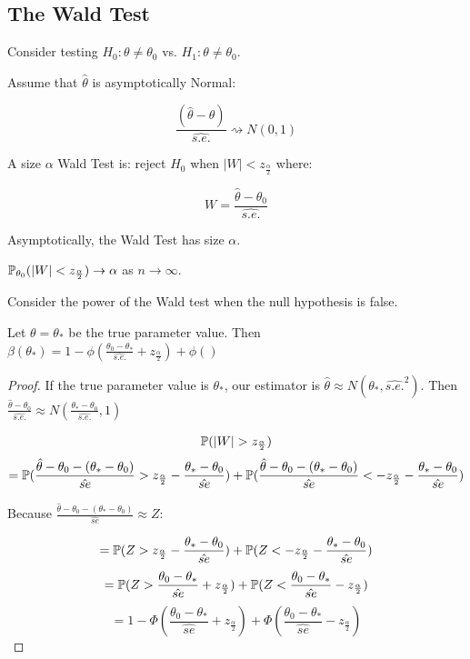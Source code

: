 \documentclass[10pt]{article}
\begin{document}
\subsection{The Wald Test}

\begin{definition}
    Consider testing $H_0: \theta \neq \theta_0$ vs. $H_1: \theta \neq \theta_0$.

    Assume that $\hat{\theta}$ is asymptotically Normal:

    \[ \frac{(\hat{\theta} - \theta)}{\hat{s.e.}} \rightsquigarrow N(0, 1)\]

    A size $\alpha$ Wald Test is: reject $H_0$ when $|W| <
    z_{\frac{\alpha}{2}}$ where:

    \[ W = \frac{\hat{\theta} - \theta_0}{\hat{s.e.}}\]
\end{definition}

\begin{theorem}
    Asymptotically, the Wald Test has size $\alpha$.

    $\P_{\theta_0}(|W| < z_{\frac{\alpha}{2}}) \rightarrow \alpha$ as $n \rightarrow \infty$.
\end{theorem}

Consider the power of the Wald test when the null hypothesis is false.

\begin{theorem}
    Let $\theta = \theta_*$ be the true parameter value. Then $\beta(\theta_*)
    = 1 - \phi(\frac{\theta_0 - \theta_*}{\hat{s.e.}} + z_{\frac{\alpha}{2}}) + \phi()$
\end{theorem}

\begin{proof}
    If the true parameter value is $\theta_*$, our estimator is $\hat{\theta}
    \approx N(\theta_*, \hat{s.e.}^2)$. Then $\frac{\hat{\theta} -
    \theta_0}{\hat{s.e.}} \approx N(\frac{\theta_* - \theta_0}{\hat{s.e.}}, 1)$

    \[\P(|W| > z_{\frac{\alpha}{2}})\] 
    \[= \P(\frac{\hat{\theta} - \theta_0 - (\theta_* - \theta_0)}{\hat{se}} >
    z_{\frac{\alpha}{2}} - \frac{\theta_* - \theta_0}{\hat{se}}) +
\P(\frac{\hat{\theta} - \theta_0 - (\theta_* - \theta_0)}{\hat{se}} < -z_{\frac{\alpha}{2}} - \frac{\theta_* - \theta_0}{\hat{se}})\]

Because $\frac{\hat{\theta} - \theta_0 - (\theta_* - \theta_0)}{\hat{se}}
\approx Z$:

    \[= \P(Z > z_{\frac{\alpha}{2}} - \frac{\theta_* - \theta_0}{\hat{se}}) + \P(Z < -z_{\frac{\alpha}{2}} - \frac{\theta_* - \theta_0}{\hat{se}})\]
    \[= \P(Z > \frac{\theta_0 - \theta_*}{\hat{se}} + z_{\frac{\alpha}{2}}) +
    \P(Z < \frac{\theta_0 - \theta_*}{\hat{se}} -z_{\frac{\alpha}{2}})\]
    \[= 1 - \Phi(\frac{\theta_0 - \theta_*}{\hat{se}} + z_{\frac{\alpha}{2}}) +
    \Phi(\frac{\theta_0 - \theta_*}{\hat{se}} -z_{\frac{\alpha}{2}})\]
\end{proof}
\end{document}
